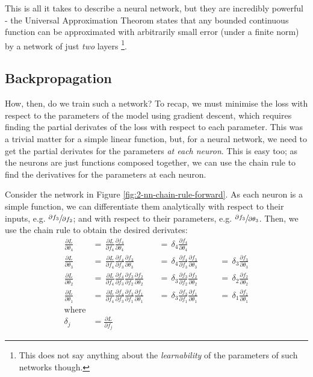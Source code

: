 This is all it takes to describe a neural network, but they are incredibly powerful -
the Universal Approximation Theorom \cite{Cybenkot1989, Hornik1989}\cite[p.~105]{Mitchell1997-ML} states that any bounded continuous function can be approximated with arbitrarily small error (under a finite norm) by a network of just \textit{two} layers
\footnote{This does not say anything about the \textit{learnability} of the parameters of such networks though.}.

\subsection{Backpropagation}
How, then, do we train such a network?
To recap, we must minimise the loss with respect to the parameters of the model using gradient descent, which requires finding the partial derivates of the loss with respect to each parameter.
This was a trivial matter for a simple linear function, but, for a neural network, we need to get the partial derivates for the parameters \textit{at each neuron}.
This is easy too; as the neurons are just functions composed together, we can use the chain rule to find the derivatives for the parameters at each neuron.

Consider the network in Figure \ref{fig:2-nn-chain-rule-forward}. As each neuron is a simple function, we can differentiate them analytically with respect to their inputs, e.g. \(\sfrac{\partial f_3}{\partial f_2}\); and with respect to their parameters, e.g. \(\sfrac{\partial f_3}{\partial \theta_3}\).
Then, we use the chain rule to obtain the desired derivates:
\begin{align*}
    \frac{\partial L}{\partial \theta_4} \,&=\, \frac{\partial L}{\partial f_4}\frac{\partial f_4}{\partial \theta_4} \,&&=\, \delta_4\frac{\partial f_4}{\partial \theta_4} \\[0.5em]
    \frac{\partial L}{\partial \theta_3} \,&=\, \frac{\partial L}{\partial f_4}\frac{\partial f_4}{\partial f_3}\frac{\partial f_3}{\partial \theta_3} \,&&=\, \delta_4\frac{\partial f_4}{\partial f_3}\frac{\partial f_3}{\partial \theta_3} \,&&&=\, \delta_3\frac{\partial f_3}{\partial \theta_3} \\[0.5em]
    \frac{\partial L}{\partial \theta_2} \,&=\, \frac{\partial L}{\partial f_4}\frac{\partial f_4}{\partial f_3}\frac{\partial f_3}{\partial f_2}\frac{\partial f_2}{\partial \theta_2} \,&&=\, \delta_3\frac{\partial f_3}{\partial f_2}\frac{\partial f_2}{\partial \theta_2} \,&&&=\, \delta_2\frac{\partial f_2}{\partial \theta_2} \\[0.5em]
    \frac{\partial L}{\partial \theta_1} \,&=\, \frac{\partial L}{\partial f_4}\frac{\partial f_4}{\partial f_3}\frac{\partial f_3}{\partial f_1}\frac{\partial f_1}{\partial \theta_1} \,&&=\, \delta_3\frac{\partial f_3}{\partial f_1}\frac{\partial f_1}{\partial \theta_1} \,&&&=\, \delta_1\frac{\partial f_1}{\partial \theta_1} \\[0.5em]
    \text{where}\\[0.6em]
    \delta_j &= \frac{\partial L}{\partial f_j}
\end{align*}

